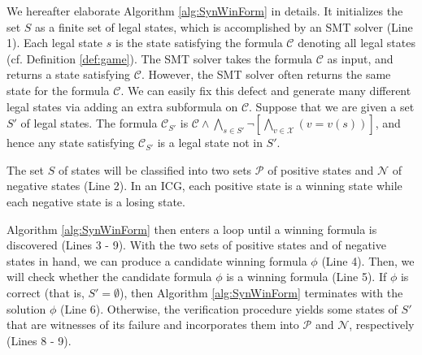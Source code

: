 \documentclass[review]{elsarticle}
\newcommand{\statevar}{\mathcal{X}}
\newcommand{\positiveSet}{\mathcal{P}}
\newcommand{\negativeSet}{\mathcal{N}}
\newcommand{\constraint}{\mathcal{C}}
\newcommand\ie{{\it i.e.}}
\newcommand{\featureSet}{\Psi}
\begin{document}
	We hereafter elaborate Algorithm \ref{alg:SynWinForm} in details.
	It initializes the set $S$ as a finite set of legal states, which is accomplished by an SMT solver (Line 1).
	Each legal state $s$ is the state satisfying the formula $\constraint$ denoting all legal states (cf. Definition \ref{def:game}).
	The SMT solver takes the formula $\constraint$ as input, and returns a state satisfying $\constraint$.
	However, the SMT solver often returns the same state for the formula $\constraint$.
	We can easily fix this defect and generate many different legal states via adding an extra subformula on $\constraint$.
	Suppose that we are given a set $S'$ of legal states.
	The formula $\constraint_{S'}$ is $\constraint \land \bigwedge_{s \in S'} \neg [\bigwedge_{v \in \statevar}(v = v(s))]$, and hence any state satisfying $\constraint_{S'}$ is a legal state not in $S'$.

	The set $S$ of states will be classified into two sets $\positiveSet$ of positive states and $\negativeSet$ of negative states (Line 2).
	In an ICG, each positive state is a winning state while each negative state is a losing state.

	Algorithm \ref{alg:SynWinForm} then enters a loop until a winning formula is discovered (Lines 3 - 9).
	With the two sets of positive states and of negative states in hand, we can produce a candidate winning formula $\phi$ (Line 4). %
	Then, we will check whether the candidate formula $\phi$ is a winning formula (Line 5). %
	If $\phi$ is correct (that is, $S' = \emptyset$), then Algorithm \ref{alg:SynWinForm} terminates with the solution $\phi$ (Line 6).
	Otherwise, the verification procedure yields some states of $S'$ that are witnesses of its failure and incorporates them into $\positiveSet$ and $\negativeSet$, respectively (Lines 8 - 9).
\end{document}
